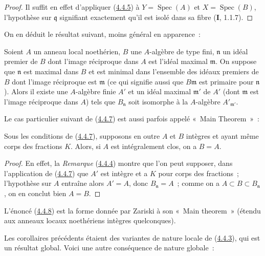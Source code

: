 \begin{proof}
Il suffit en effet d'appliquer (\hyperref[III.4.4.5-fr]{4.4.5}) à
$Y=\operatorname{Spec}(A)$ et $X=\operatorname{Spec}(B)$, l'hypothèse sur
$\mathfrak q$ signifiant exactement qu'il est isolé dans sa fibre
(\textbf{I}, 1.1.7).
\end{proof}

On en déduit le résultat suivant, moins général en apparence~:

\begin{corollary}[4.4.7]
\label{III.4.4.7-fr}
Soient $A$ un anneau local noethérien, $B$ une $A$-algèbre de type fini,
$\mathfrak n$ un idéal premier de $B$ dont l'image réciproque dans $A$ est
l'idéal maximal $\mathfrak m$. On suppose que $\mathfrak n$ est maximal dans
$B$ et est minimal dans l'ensemble des idéaux premiers de $B$ dont l'image
réciproque est $\mathfrak m$ (ce qui signifie aussi que
$B\mathfrak m$ est primaire pour $\mathfrak n$). Alors il existe une
$A$-algèbre finie $A'$ et un idéal maximal $\mathfrak m'$ de $A'$ (dont
$\mathfrak m$ est l'image réciproque dans $A$) tels que $B_{\mathfrak n}$
soit isomorphe à la $A$-algèbre $A'_{\mathfrak m'}$.
\end{corollary}

Le cas particulier suivant de (\hyperref[III.4.4.7-fr]{4.4.7}) est aussi
parfois appelé «~Main Theorem~»~:

\begin{corollary}[4.4.8]
\label{III.4.4.8-fr}
Sous les conditions de \textup{(\hyperref[III.4.4.7-fr]{4.4.7})}, supposons en outre
$A$ et $B$ intègres et ayant même corps des fractions $K$. Alors, si $A$ est
intégralement clos, on a $B=A$.
\end{corollary}

\begin{proof}
En effet, la \emph{Remarque} (\hyperref[III.4.4.4-fr]{4.4.4}) montre que l'on peut
supposer, dans l'application de (\hyperref[III.4.4.7-fr]{4.4.7}) que $A'$ est
intègre et a $K$ pour corps des fractions~; l'hypothèse sur $A$ entraîne alors
$A'=A$, donc $B_{\mathfrak n}=A$~; comme on a
$A\subset B\subset B_{\mathfrak n}$, on en conclut bien $A=B$.
\end{proof}

L'énoncé (\hyperref[III.4.4.8-fr]{4.4.8}) est la forme donnée par Zariski à
son «~Main theorem~» (étendu aux anneaux locaux noethériens intègres
quelconques).

Les corollaires précédents étaient des variantes de nature locale de
(\hyperref[III.4.4.3-fr]{4.4.3}), qui est un résultat global. Voici une autre
conséquence de nature globale~:

